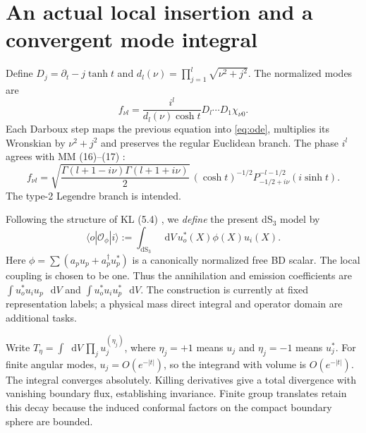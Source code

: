 \documentclass[11pt,a4paper]{article}
\newcommand{\dd}{\mathop{}\!\mathrm d}
\begin{document}
\section{An actual local insertion and a convergent mode integral}
Define $D_j=\partial_t-j\tanh t$ and
$d_l(\nu)=\prod_{j=1}^l\sqrt{\nu^2+j^2}$. The normalized modes are
\begin{equation}
 f_{\nu l}=\frac{i^l}{d_l(\nu)\cosh t}
 D_l\cdots D_1\chi_{\nu0}.
 \label{eq:darboux}
\end{equation}
Each Darboux step maps the previous equation into \eqref{eq:ode},
multiplies its Wronskian by $\nu^2+j^2$ and preserves the regular
Euclidean branch. The phase $i^l$ agrees with MM (16)--(17)
\cite{mm}:
\begin{equation}
 f_{\nu l}=
 \sqrt{\frac{\Gamma(l+1-i\nu)\Gamma(l+1+i\nu)}2}\,
 (\cosh t)^{-1/2}P_{-1/2+i\nu}^{-l-1/2}(i\sinh t).
 \label{eq:legendre}
\end{equation}
The type-2 Legendre branch is intended.

Following the structure of KL (5.4) \cite{kl}, we \emph{define}
the present dS$_3$ model by
\begin{equation}
 \langle o|\mathcal O_\phi|i\rangle
 :=\int_{\mathrm{dS}_3}\dd V\,u_o^*(X)\phi(X)u_i(X).
 \label{eq:insertion}
\end{equation}
Here $\phi=\sum(a_pu_p+a_p^\dagger u_p^*)$ is a canonically
normalized free BD scalar. The local coupling is chosen to be one.
Thus the annihilation and emission coefficients are
$\int u_o^*u_i u_p\,\dd V$ and $\int u_o^*u_i u_p^*\,\dd V$.
The construction is currently at fixed representation labels; a
physical mass direct integral and operator domain are additional tasks.

Write $T_\eta=\int\dd V\,\prod_j u_j^{(\eta_j)}$, where $\eta_j=+1$
means $u_j$ and $\eta_j=-1$ means $u_j^*$. For finite angular modes,
$u_j=O(e^{-|t|})$, so the integrand with volume is $O(e^{-|t|})$.
The integral converges absolutely. Killing derivatives give a
total divergence with vanishing boundary flux, establishing
invariance. Finite group translates retain this decay because the
induced conformal factors on the compact boundary sphere are bounded.
\end{document}

